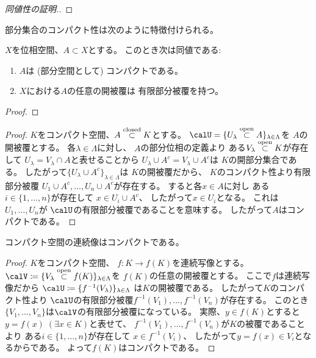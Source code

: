 \documentclass[report]{jlreq}
\begin{document}
\begin{proof}[同値性の証明.]
    \TODO{}
\end{proof}

部分集合のコンパクト性は次のように特徴付けられる。

\begin{proposition}[部分集合のコンパクト性の特徴付け]
    $X$を位相空間、$A \subset X$とする。
    このとき次は同値である:
    \begin{enumerate}
        \item $A$は (部分空間として) コンパクトである。
        \item $X$における$A$の任意の開被覆は
            有限部分被覆を持つ。
    \end{enumerate}
\end{proposition}

\begin{proof}
    \TODO{}
\end{proof}


\begin{proof}
    $K$をコンパクト空間、$A \stackrel{\text{closed}}{\subset} K$とする。
    $\calU = \{ U_\lambda \opensubset A \}_{\lambda \in \Lambda}$を
    $A$の開被覆とする。
    各$\lambda \in \Lambda$に対し、
    $A$の部分位相の定義より
    ある$V_\lambda \stackrel{\text{open}}{\subset} K$が存在して
    $U_\lambda = V_\lambda \cap A$と表せることから
    $U_\lambda \cup A^c = V_\lambda \cup A^c$は
    $K$の開部分集合である。
    したがって$\{ U_\lambda \cup A^c \}_{\lambda \in \Lambda}$は
    $K$の開被覆だから、
    $K$のコンパクト性より有限部分被覆
    $U_1 \cup A^c, \dots, U_n \cup A^c$が存在する。
    すると各$x \in A$に対し
    ある$i \in \{ 1, \dots, n \}$が存在して
    $x \in U_i \cup A^c$、
    したがって$x \in U_i$となる。
    これは$U_1, \dots, U_n$が
    $\calU$の有限部分被覆であることを意味する。
    したがって$A$はコンパクトである。
\end{proof}

\begin{lemma}
    コンパクト空間の連続像はコンパクトである。
\end{lemma}

\begin{proof}
    $K$をコンパクト空間、
    $f \colon K \to f(K)$を連続写像とする。
    $\calV \coloneqq \{ V_\lambda \opensubset f(K) \}_{\lambda \in \Lambda}$を
    $f(K)$の任意の開被覆とする。
    ここで$f$は連続写像だから
    $\calU \coloneqq \{ f^{-1}(V_\lambda) \}_{\lambda \in \Lambda}$
    は$K$の開被覆である。
    したがって$K$のコンパクト性より
    $\calU$の有限部分被覆$f^{-1}(V_1), \dots, f^{-1}(V_n)$が存在する。
    このとき$\{ V_1, \dots, V_n \}$は$\calV$の有限部分被覆になっている。
    実際、$y \in f(K)$とすると
    $y = f(x) \; (\exists x \in K)$と表せて、
    $f^{-1}(V_1), \dots, f^{-1}(V_n)$が$K$の被覆であることより
    ある$i \in \{ 1, \dots, n \}$が存在して
    $x \in f^{-1}(V_i)$、
    したがって$y = f(x) \in V_i$となるからである。
    よって$f(K)$はコンパクトである。
\end{proof}
\end{document}
